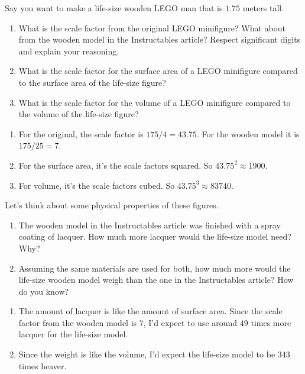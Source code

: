 \documentclass[handout,nooutcomes,noauthor,hints,12pt]{ximera}
\begin{document}
\begin{question}
 Say you want to make a life-size wooden LEGO man that is $1.75$
 meters tall.
 
\begin{enumerate}
 \item What is the scale factor from the original LEGO minifigure?
   What about from the wooden model in the Instructables article? Respect significant digits and explain your reasoning.
 \item What is the scale factor for the surface area of a LEGO
   minifigure compared to the surface area of the life-size figure?
 \item What is the scale factor for the volume of a LEGO
   minifigure compared to the volume of the life-size figure?
\end{enumerate}
\begin{freeResponse}
  \begin{enumerate}
\item For the original, the scale factor is $175/4 = 43.75$. For the wooden model it is $175/25 = 7$.
\item For the surface area, it's the scale factors squared. So $43.75^2\approx 1900$.
\item For volume, it's the scale factors cubed. So $43.75^3\approx 83740$.
  \end{enumerate}
\end{freeResponse}
\end{question}
\mynewpage

\begin{question}
  Let's think about some physical properties of these figures.
  \begin{enumerate}
 \item The wooden model in the Instructables article was finished with
   a spray coating of lacquer.  How much more lacquer would the life-size model need? Why?
 \item Assuming the same materials are used for both, how much more
   would the life-size wooden model weigh than the one in the
   Instructables article?  How do you know?
\end{enumerate}
  \begin{freeResponse}
    \begin{enumerate}
  \item The amount of lacquer is like the amount of surface
    area. Since the scale factor from the wooden model is $7$, I'd
    expect to use around $49$ times more lacquer for the life-size
    model.
  \item Since the weight is like the volume, I'd expect the life-size model to be $343$ times heaver.
    \end{enumerate}
    \end{freeResponse}
\end{question}
\end{document}
